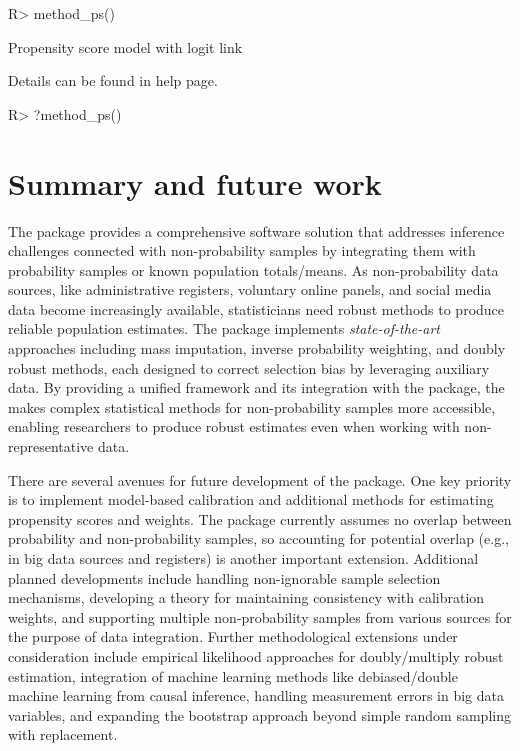 \documentclass[
]{jss}
\begin{document}
\begin{CodeChunk}
\begin{CodeInput}
R> method_ps()
\end{CodeInput}
\begin{CodeOutput}
Propensity score model with logit link
\end{CodeOutput}
\end{CodeChunk}

Details can be found in help page.

\begin{CodeChunk}
\begin{CodeInput}
R> ?method_ps()
\end{CodeInput}
\end{CodeChunk}

\section{Summary and future work}\label{summary-and-future-work}

The  package provides a comprehensive 
software solution that addresses inference challenges connected with
non-probability samples by integrating them with probability samples or
known population totals/means. As non-probability data sources, like
administrative registers, voluntary online panels, and social media data
become increasingly available, statisticians need robust methods to
produce reliable population estimates. The package implements
\textit{state-of-the-art} approaches including mass imputation, inverse
probability weighting, and doubly robust methods, each designed to
correct selection bias by leveraging auxiliary data. By providing a
unified framework and its integration with the  package, the
 makes complex statistical methods for non-probability
samples more accessible, enabling researchers to produce robust
estimates even when working with non-representative data.

There are several avenues for future development of the 
package. One key priority is to implement model-based calibration and
additional methods for estimating propensity scores and weights. The
package currently assumes no overlap between probability and
non-probability samples, so accounting for potential overlap (e.g., in
big data sources and registers) is another important extension.
Additional planned developments include handling non-ignorable sample
selection mechanisms, developing a theory for maintaining consistency
with calibration weights, and supporting multiple non-probability
samples from various sources for the purpose of data integration.
Further methodological extensions under consideration include empirical
likelihood approaches for doubly/multiply robust estimation, integration
of machine learning methods like debiased/double machine learning from
causal inference, handling measurement errors in big data variables, and
expanding the bootstrap approach beyond simple random sampling with
replacement.
\end{document}
